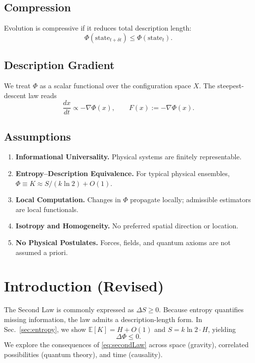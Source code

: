 \documentclass[aps,preprint,onecolumn,longbibliography,nofootinbib]{revtex4-2}
\numberwithin{equation}{section}
\begin{document}
\subsection{Compression}
Evolution is compressive if it reduces total description length:
\begin{equation}
\Phi(\text{state}_{t+\delta t}) \le \Phi(\text{state}_t). \label{eq:compressive}
\end{equation}

\subsection{Description Gradient}
We treat $\Phi$ as a scalar functional over the configuration space $X$. The steepest-descent law reads
\begin{equation}
\frac{dx}{dt} \propto -\nabla \Phi(x), \qquad F(x) := -\nabla\Phi(x). \label{eq:desc}
\end{equation}

\subsection*{Assumptions}
\begin{enumerate}
\item \textbf{Informational Universality.} Physical systems are finitely representable.
\item \textbf{Entropy--Description Equivalence.} For typical physical ensembles, $\Phi \equiv K \approx S/(k\ln2) + O(1)$.
\item \textbf{Local Computation.} Changes in $\Phi$ propagate locally; admissible estimators are local functionals.
\item \textbf{Isotropy and Homogeneity.} No preferred spatial direction or location.
\item \textbf{No Physical Postulates.} Forces, fields, and quantum axioms are not assumed a priori.
\end{enumerate}

\section{Introduction (Revised)}
The Second Law is commonly expressed as $\Delta S \ge 0$. Because entropy quantifies missing information, the law admits a description-length form. In Sec.~\ref{sec:entropy}, we show $\mathbb{E}[K]=H+O(1)$ and $S=k\ln 2\cdot H$, yielding
\begin{equation}
\Delta\Phi \le 0. \label{eq:secondLaw}
\end{equation}
We explore the consequences of \eqref{eq:secondLaw} across space (gravity), correlated possibilities (quantum theory), and time (causality).
\end{document}
